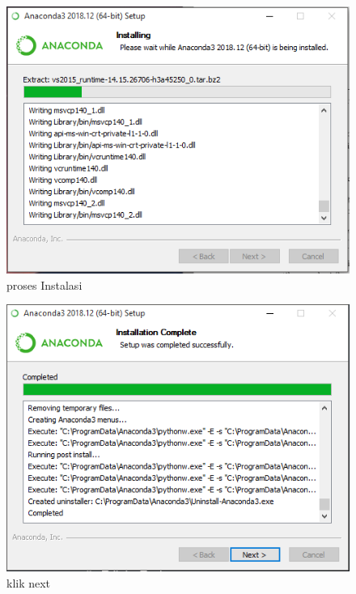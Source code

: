 \begin{enumerate}
\begin{figure}
\centerline{\includegraphics[width=1\textwidth]{figures/fathi/7.PNG}}
\caption{proses Instalasi}
\label{proses7}
\end{figure}
\begin{figure}
\centerline{\includegraphics[width=1\textwidth]{figures/fathi/8.PNG}}
\caption{klik next}
\label{proses8}


\end{figure}
\end{enumerate}
